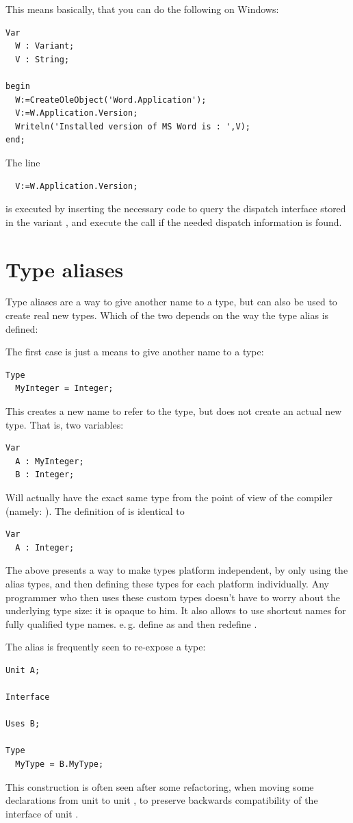 This means basically, that you can do the following on Windows:
\begin{verbatim}
Var
  W : Variant;
  V : String;

begin
  W:=CreateOleObject('Word.Application');
  V:=W.Application.Version;
  Writeln('Installed version of MS Word is : ',V);
end;
\end{verbatim}
The line
\begin{verbatim}
  V:=W.Application.Version;
\end{verbatim}
is executed by inserting the necessary code to query the dispatch interface
stored in the variant , and execute the call if the needed dispatch
information is found.

\section{Type aliases}
Type aliases are a way to give another name to a type, but can also be used
to create real new types. Which of the two depends on the way the type alias
is defined:

The first case is just a means to give another name to a type:
\begin{verbatim}
Type
  MyInteger = Integer;
\end{verbatim}
This creates a new name to refer to the  type, but does not create an
actual new type. That is, two variables:
\begin{verbatim}
Var
  A : MyInteger;
  B : Integer;
\end{verbatim}
Will actually have the exact same type from the point of view of the compiler
(namely: ). The definition of  is identical to
\begin{verbatim}
Var
  A : Integer;
\end{verbatim}

The above presents a way to make types platform independent, by only using the
alias types, and then defining these types for each platform individually.
Any programmer who then uses these custom types doesn't have to worry
about the underlying type size: it is opaque to him. It also allows to use shortcut names
for fully qualified type names. e.\,g. define  as
 and then redefine .

The alias is frequently seen to re-expose a type:
\begin{verbatim}
Unit A;

Interface

Uses B;

Type
  MyType = B.MyType;
\end{verbatim}
This construction is often seen after some refactoring, when moving some
declarations from unit  to unit , to preserve backwards compatibility
of the interface of unit .

